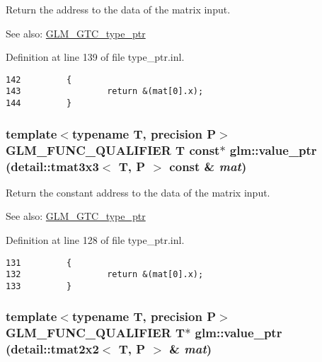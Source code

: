 Return the address to the data of the matrix input. \begin{Desc}
\item[See also:]\hyperlink{group__gtc__type__ptr}{GLM\_\-GTC\_\-type\_\-ptr} \end{Desc}


Definition at line 139 of file type\_\-ptr.inl.

\begin{Code}\begin{verbatim}142         {
143                 return &(mat[0].x);
144         }
\end{verbatim}
\end{Code}


\hypertarget{group__gtc__type__ptr_g78aceb3dc479cf7745bc5a0d9f751504}{
\subsubsection[value\_\-ptr]{\setlength{\rightskip}{0pt plus 5cm}template$<$typename T, precision P$>$ GLM\_\-FUNC\_\-QUALIFIER T const$\ast$ glm::value\_\-ptr (detail::tmat3x3$<$ T, P $>$ const \& {\em mat})}}
\label{group__gtc__type__ptr_g78aceb3dc479cf7745bc5a0d9f751504}


Return the constant address to the data of the matrix input. \begin{Desc}
\item[See also:]\hyperlink{group__gtc__type__ptr}{GLM\_\-GTC\_\-type\_\-ptr} \end{Desc}


Definition at line 128 of file type\_\-ptr.inl.

\begin{Code}\begin{verbatim}131         {
132                 return &(mat[0].x);
133         }
\end{verbatim}
\end{Code}


\hypertarget{group__gtc__type__ptr_g2005106958abf8304187586557d11444}{
\subsubsection[value\_\-ptr]{\setlength{\rightskip}{0pt plus 5cm}template$<$typename T, precision P$>$ GLM\_\-FUNC\_\-QUALIFIER T$\ast$ glm::value\_\-ptr (detail::tmat2x2$<$ T, P $>$ \& {\em mat})}}
\label{group__gtc__type__ptr_g2005106958abf8304187586557d11444}


